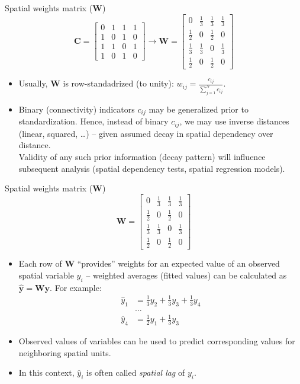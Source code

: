 \documentclass{beamer}
\begin{document}
\begin{frame}{Spatial weights matrix ($\bm{W}$)}
\vspace{-0.5cm}
$$
\bm{C} = \begin{bmatrix}
0 & 1 & 1 & 1 \\
1 & 0 & 1 & 0 \\
1 & 1 & 0 & 1 \\
1 & 0 & 1 & 0
\end{bmatrix}\rightarrow 
\bm{W}=
\begin{bmatrix}
0 & \tfrac{1}{3} & \tfrac{1}{3} & \tfrac{1}{3} \\[2pt]
\tfrac{1}{2} & 0 & \tfrac{1}{2} & 0 \\[2pt]
\tfrac{1}{3} & \tfrac{1}{3} & 0 & \tfrac{1}{3} \\[2pt]
\tfrac{1}{2} & 0 & \tfrac{1}{2} & 0
\end{bmatrix}
$$
\begin{itemize}
	\item Usually, $\bm{W}$ is row-standadrized (to unity): 
	$w_{ij} = \frac{c_{ij}}{\sum^N_{j=1} c_{ij}}$.
	\smallskip
	\item Binary (connectivity) indicators $c_{ij}$ may be generalized prior to standardization. Hence, instead of binary $c_{ij}$, we may use inverse distances (linear, squared, \dots) -- given assumed decay in spatial dependency over distance. \\ \medskip Validity of any such prior information (decay pattern) will influence subsequent analysis (spatial dependency tests, spatial regression models).
\end{itemize}
\end{frame}
\begin{frame}{Spatial weights matrix ($\bm{W}$)}
\vspace{-0.2cm}
$$
\bm{W}=
\begin{bmatrix}
0 & \tfrac{1}{3} & \tfrac{1}{3} & \tfrac{1}{3} \\[2pt]
\tfrac{1}{2} & 0 & \tfrac{1}{2} & 0 \\[2pt]
\tfrac{1}{3} & \tfrac{1}{3} & 0 & \tfrac{1}{3} \\[2pt]
\tfrac{1}{2} & 0 & \tfrac{1}{2} & 0
\end{bmatrix}
$$
\begin{itemize}
	\item Each row of $\bm{W}$ ``provides'' weights for an expected value of an observed spatial variable $y_i$ -- weighted averages (fitted values) can be calculated as $\hat{\bm{y}} = \bm{Wy}$. For example:
	\begin{align*}
	\hat{y}_1 & =  \tfrac{1}{3} y_2 + \tfrac{1}{3} y_3 + \tfrac{1}{3} y_4 \\
	&\dots \\
	\hat{y}_4 & = \tfrac{1}{2} y_1  + \tfrac{1}{3} y_3 
	\end{align*}
	\item Observed values of variables can be used to predict corresponding values for neighboring spatial units.
	\smallskip
	\item In this context, $\hat{y}_i$ is often called \textit{spatial lag} of $y_i$.
\end{itemize}
\end{frame}
\end{document}
